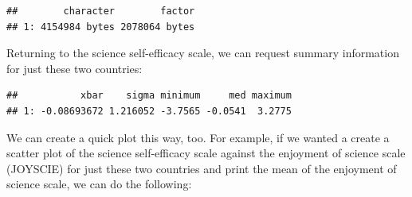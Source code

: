 \documentclass[]{book}
\newenvironment{Shaded}{\begin{snugshade}}{\end{snugshade}}
\newcommand{\DataTypeTok}[1]{\textcolor[rgb]{0.13,0.29,0.53}{#1}}
\newcommand{\DecValTok}[1]{\textcolor[rgb]{0.00,0.00,0.81}{#1}}
\newcommand{\FloatTok}[1]{\textcolor[rgb]{0.00,0.00,0.81}{#1}}
\newcommand{\KeywordTok}[1]{\textcolor[rgb]{0.13,0.29,0.53}{\textbf{#1}}}
\newcommand{\NormalTok}[1]{#1}
\newcommand{\OperatorTok}[1]{\textcolor[rgb]{0.81,0.36,0.00}{\textbf{#1}}}
\newcommand{\StringTok}[1]{\textcolor[rgb]{0.31,0.60,0.02}{#1}}
\begin{document}
\begin{verbatim}
##        character        factor
## 1: 4154984 bytes 2078064 bytes
\end{verbatim}

Returning to the science self-efficacy scale, we can request summary information for just these two countries:

\begin{Shaded}
\end{Shaded}

\begin{verbatim}
##           xbar    sigma minimum     med maximum
## 1: -0.08693672 1.216052 -3.7565 -0.0541  3.2775
\end{verbatim}

We can create a quick plot this way, too. For example, if we wanted a create a scatter plot of the science self-efficacy scale against the enjoyment of science scale (JOYSCIE) for just these two countries and print the mean of the enjoyment of science scale, we can do the following:

\begin{Shaded}
\end{Shaded}
\end{document}
